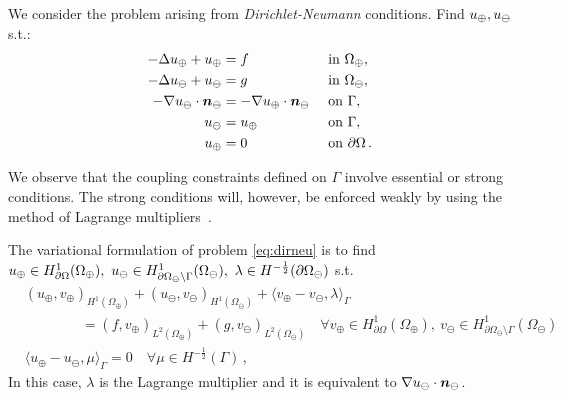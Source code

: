 \documentclass[r]{siamart171218}
\begin{document}
We consider the problem arising from \emph{Dirichlet-Neumann} conditions. Find $u_{\oplus},u_{\ominus}$ s.t.:
\begin{subequations}\label{eq:dirneu}
\begin{align}
\label{eq:dirneu1}
- \Delta \up  + \up &= f  && \text{ in } \Omega_{\oplus},\\
\label{eq:dirneu2}
- \Delta \uf  + \uf &= g  && \text{ in } \Omega_\ominus,\\
\label{eq:dirneu3}
-\nabla \uf \cdot \nn_{\ominus} &= -\nabla \up \cdot \nn_{\ominus}  && \text{ on } \Gamma,\\
\label{eq:dirneu4}
\uf &= \up && \text{ on }  \Gamma,\\
\label{eq:dirneu5}
\up &= 0 && \text{ on } \partial \Omega\,.
\end{align}
\end{subequations}

We observe that the coupling constraints defined on $\Gamma$ involve essential or strong conditions.
The strong conditions will, however, be enforced weakly by using the method of Lagrange multipliers~\cite{MR359352}.

The variational formulation of problem \eqref{eq:dirneu}
is to find $u_{\oplus} \in H^1_{\partial\Omega}(\Omega_\oplus), \ u_{\ominus} \in H^1_{\partial\Omega_\ominus\setminus\Gamma}(\Omega_\ominus), \ \lambda \in H^{-\frac12}(\partial\Omega_\ominus)$ s.t.
\begin{subequations}\label{eq:weak_dirneu}
\begin{align}
&(u_\oplus,v_\oplus)_{H^1(\Omega_\oplus)} + (u_\ominus,v_\ominus)_{H^1(\Omega_\ominus)} 
+ \langle  v_\oplus - v_\ominus, \lambda \rangle_{\Gamma} 
\\
\nonumber
&\qquad\qquad = (f,v_\oplus)_{L^2(\Omega_\oplus)} + (g,v_\ominus)_{L^2(\Omega_\ominus)}
\quad \forall v_\oplus \in H^1_{\partial\Omega}(\Omega_\oplus), \ v_\ominus \in H^1_{\partial\Omega_\ominus\setminus\Gamma}(\Omega_\ominus)
\\
& \langle u_\oplus - u_\ominus, \mu \rangle_{\Gamma} = 0
\quad \forall  \mu \in H^{-\frac12}(\Gamma)\,,
\end{align}
\end{subequations}
In this case, $\lambda$ is the Lagrange multiplier and it is equivalent to $\nabla u_{\ominus} \cdot \boldsymbol n_\ominus$.
\end{document}
